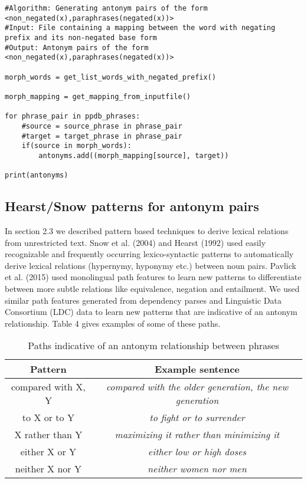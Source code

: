 \documentclass[11pt]{article}
\begin{document}
\begin{lstlisting}
#Algorithm: Generating antonym pairs of the form <non_negated(x),paraphrases(negated(x))>
#Input: File containing a mapping between the word with negating prefix and its non-negated base form
#Output: Antonym pairs of the form <non_negated(x),paraphrases(negated(x))>

morph_words = get_list_words_with_negated_prefix()

morph_mapping = get_mapping_from_inputfile()

for phrase_pair in ppdb_phrases:
    #source = source_phrase in phrase_pair
    #target = target_phrase in phrase_pair
    if(source in morph_words):
        antonyms.add((morph_mapping[source], target))

print(antonyms)
\end{lstlisting}

\subsection{Hearst/Snow patterns for antonym pairs}
In section 2.3 we described pattern based techniques to derive lexical relations from unrestricted text. Snow et al. (2004) and Hearst (1992) used easily recognizable and frequently occurring lexico-syntactic patterns to automatically derive lexical relations (hypernymy, hyponymy etc.) between noun pairs. Pavlick et al. (2015) used monolingual path features to learn new patterns to differentiate between more subtle relations like equivalence, negation and entailment. We used similar path features generated from dependency parses and Linguistic Data Consortium (LDC) data to learn new patterns that are indicative of an antonym relationship. Table 4 gives examples of some of these paths.
\begin{table*}
\centering
\begin{tabular}{|c|c|}
\hline
Pattern & Example sentence\\
\hline
compared with X, Y & \textit{compared with the older generation, the new generation}\\
to X or to Y & \textit{to fight or to surrender}\\
X rather than Y & \textit{maximizing it rather than minimizing it}\\
either X or Y & \textit{either low or high doses}\\
neither X nor Y & \textit{neither women nor men}\\
\hline
\end{tabular}
\caption{Paths indicative of an antonym relationship between phrases}
\end{table*}
\end{document}
